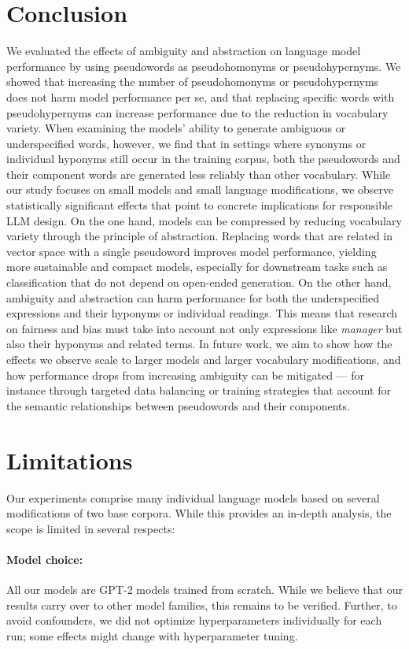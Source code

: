 \documentclass[final]{clv2025}
\begin{document}
\section{Conclusion} \label{sec:conclusion}
We evaluated the effects of ambiguity and abstraction on language model performance by using pseudowords as pseudohomonyms or pseudohypernyms. We showed that increasing the number of pseudohomonyms or pseudohypernyms does not harm model performance per se, and that replacing specific words with pseudohypernyms can increase performance due to the reduction in vocabulary variety. When examining the models' ability to generate ambiguous or underspecified words, however, we find that in settings where synonyms or individual hyponyms still occur in the training corpus, both the pseudowords and their component words are generated less reliably than other vocabulary.
While our study focuses on small models and small language modifications, we observe statistically significant effects that point to concrete implications for responsible LLM design. On the one hand, models can be compressed by reducing vocabulary variety through the principle of abstraction. Replacing words that are related in vector space with a single pseudoword improves model performance, yielding more sustainable and compact models, especially for downstream tasks such as classification that do not depend on open-ended generation. On the other hand, ambiguity and abstraction can harm performance for both the underspecified expressions and their hyponyms or individual readings. This means that research on fairness and bias must take into account not only expressions like \emph{manager} but also their hyponyms and related terms.
In future work, we aim to show how the effects we observe scale to larger models and larger vocabulary modifications, and how performance drops from increasing ambiguity can be mitigated — for instance through targeted data balancing or training strategies that account for the semantic relationships between pseudowords and their components.
\section*{Limitations}
Our experiments comprise many individual language models based on several modifications of two base corpora. While this provides an in-depth analysis, the scope is limited in several respects:
\paragraph{Model choice:} All our models are GPT-2 models trained from scratch. While we believe that our results carry over to other model families, this remains to be verified. Further, to avoid confounders, we did not optimize hyperparameters individually for each run; some effects might change with hyperparameter tuning.
\end{document}
